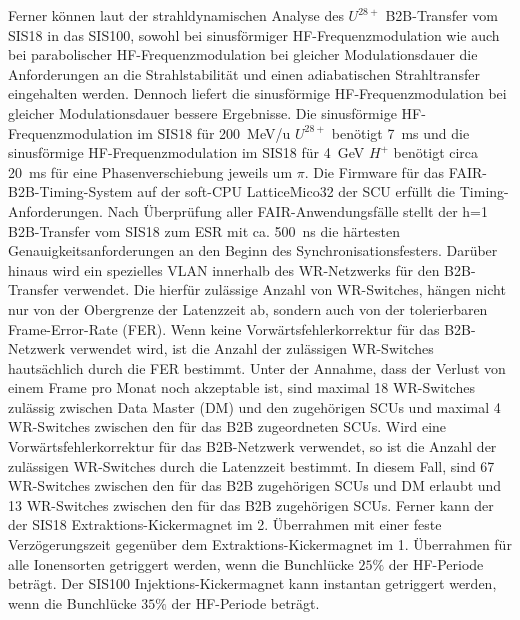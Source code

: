 Ferner k\"onnen laut der strahldynamischen Analyse des $U^\mathit{28+}$ B2B-Transfer vom SIS18 in das SIS100, sowohl bei sinusf\"ormiger HF-Frequenzmodulation wie auch bei parabolischer HF-Frequenzmodulation bei gleicher Modulationsdauer die Anforderungen an die Strahlstabilit\"at und einen adiabatischen Strahltransfer eingehalten werden. Dennoch liefert die sinusf\"ormige HF-Frequenzmodulation bei gleicher Modulationsdauer bessere Ergebnisse. Die sinusf\"ormige HF-Frequenzmodulation im SIS18 f\"ur
\SI{200}{MeV/u} $U^\mathit{28+}$ ben\"otigt \SI{7}{\ms} und die sinusf\"ormige HF-Frequenzmodulation im SIS18 f\"ur \SI{4}{GeV} $H^+$ ben\"otigt circa \SI{20}{\ms} f\"ur eine Phasenverschiebung jeweils um $\pi$. Die Firmware f\"ur das FAIR-B2B-Timing-System auf der soft-CPU LatticeMico32 der SCU erf\"ullt die Timing-Anforderungen. Nach \"Uberpr\"ufung aller FAIR-Anwendungsf\"alle stellt der h=1 B2B-Transfer vom SIS18 zum ESR mit ca. \SI{500}{\ns} die h\"artesten Genauigkeitsanforderungen an den Beginn des Synchronisationsfesters. Dar\"uber hinaus wird ein spezielles VLAN innerhalb des WR-Netzwerks f\"ur den B2B-Transfer verwendet. Die hierf\"ur zul\"assige Anzahl von WR-Switches, h\"angen nicht nur von der Obergrenze der Latenzzeit ab, sondern auch von der tolerierbaren Frame-Error-Rate (FER). Wenn keine Vorw\"artsfehlerkorrektur f\"ur das B2B-Netzwerk verwendet wird, ist die Anzahl der zul\"assigen WR-Switches hauts\"achlich durch die FER bestimmt. Unter der Annahme, dass der Verlust von einem Frame pro Monat noch akzeptable ist, sind maximal 18 WR-Switches zul\"assig zwischen Data Master (DM) und den zugeh\"origen SCUs und maximal 4 WR-Switches zwischen den f\"ur das B2B zugeordneten SCUs. Wird eine Vorw\"artsfehlerkorrektur f\"ur das B2B-Netzwerk verwendet, so ist die Anzahl der zul\"assigen WR-Switches durch die Latenzzeit bestimmt. In diesem Fall, sind 67 WR-Switches zwischen den f\"ur das B2B zugeh\"origen SCUs  und DM erlaubt und 13 WR-Switches zwischen den f\"ur das B2B zugeh\"origen SCUs. Ferner kann der der SIS18 Extraktions-Kickermagnet im 2. \"Uberrahmen mit einer feste Verz\"ogerungszeit gegen\"uber dem Extraktions-Kickermagnet im 1. \"Uberrahmen  f\"ur alle Ionensorten getriggert werden, wenn die Bunchl\"ucke $25\%$ der HF-Periode betr\"agt. Der SIS100 Injektions-Kickermagnet kann instantan getriggert werden, wenn die Bunchl\"ucke $35\%$ der HF-Periode betr\"agt. 

